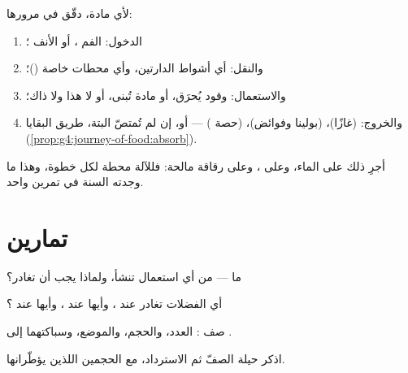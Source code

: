\begin{method}\label{met:g7:removing-wastes:audit}
لأي مادة، دقّق في مرورها:
\begin{enumerate}
  \item الدخول: الفم ، أو الأنف ؛
  \item والنقل: أي أشواط الدارتين، وأي محطات خاصة ()؛
  \item والاستعمال: وقود يُحرَق، أو مادة تُبنى، أو لا هذا ولا
        ذاك؛
  \item والخروج:  (غازًا)،  (بولينا وفوائض)،
         (حصة ) --- أو، إن لم تُمتصّ البتة، طريق
        البقايا (\cref{prop:g4:journey-of-food:absorb}).
\end{enumerate}
أجرِ ذلك على الماء، وعلى ، وعلى رقاقة مالحة: فللآلة محطة
لكل خطوة، وهذا ما وجدته السنة في تمرين واحد.
\end{method}

\section{تمارين}

\begin{exercise}[$\star$]\label{exo:g7:removing-wastes:1}
ما  --- من أي استعمال تنشأ، ولماذا يجب أن تغادر؟
\end{exercise}

\begin{exercise}[$\star$]\label{exo:g7:removing-wastes:2}
أي الفضلات تغادر عند ، وأيها عند ، وأيها عند
؟
\end{exercise}

\begin{exercise}[$\star$]\label{exo:g7:removing-wastes:3}
صف : العدد، والحجم، والموضع، وسباكتهما إلى .
\end{exercise}

\begin{exercise}[$\star$]\label{exo:g7:removing-wastes:4}
اذكر حيلة الصفّ ثم الاسترداد، مع الحجمين اللذين يؤطّرانها.
\end{exercise}

